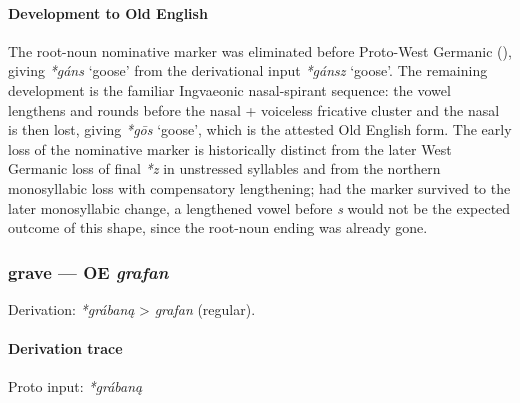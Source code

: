 \documentclass[
  british,
  a4paper,
]{article}
\providecommand{\Recon}[1]{\emph{*#1}}
\begin{document}
\paragraph{Development to Old
English}\label{development-to-old-english-25}

The root-noun nominative marker was eliminated before Proto-West
Germanic (),
giving \Recon{gáns} `goose' from the derivational input \Recon{gánsz}
`goose'. The remaining development is the familiar Ingvaeonic
nasal-spirant sequence: the vowel lengthens and rounds before the nasal
+ voiceless fricative cluster and the nasal is then lost, giving
\Recon{gōs} `goose', which is the attested Old English form. The early
loss of the nominative marker is historically distinct from the later
West Germanic loss of final \emph{*z} in unstressed syllables and from
the northern monosyllabic loss with compensatory lengthening; had the
marker survived to the later monosyllabic change, a lengthened vowel
before \emph{s} would not be the expected outcome of this shape, since
the root-noun ending was already gone.

\subsubsection{\texorpdfstring{grave --- OE
\emph{grafan}}{grave --- OE grafan}}\label{grave-oe-grafan}

Derivation: \emph{*grábaną} \textgreater{} \emph{grafan} (regular).

\paragraph{Derivation trace}\label{derivation-trace-29}

Proto input: \emph{*grábaną}

\begingroup
\setlength{\fboxsep}{6pt}
\end{document}
